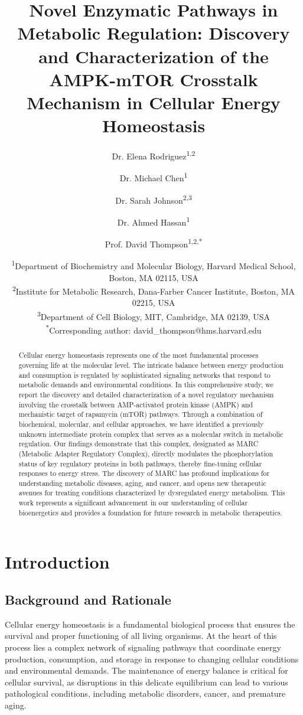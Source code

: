 \documentclass[11
pt,a4paper]{article}
\title{Novel Enzymatic Pathways in Metabolic Regulation: Discovery and Characterization of the AMPK-mTOR Crosstalk Mechanism in Cellular Energy %
Homeostasis}
\author{Dr. Elena Rodriguez\textsuperscript{1,2} \and 
        Dr. Michael Chen\textsuperscript{1} \and 
        Dr. Sarah Johnson\textsuperscript{2,3} \and 
        Dr. Ahmed Hassan\textsuperscript{1} \and 
        Prof. David Thompson\textsuperscript{1,2,*}}
\date{\textsuperscript{1}Department of Biochemistry and Molecular Biology, Harvard Medical School, Boston, MA 02115, USA\\
\textsuperscript{2}Institute for Metabolic Research, Dana-Farber Cancer Institute, Boston, MA 02215, USA\\
\textsuperscript{3}Department of Cell Biology, MIT, Cambridge, MA 02139, USA\\
\textsuperscript{*}Corresponding author: david\_thompson@hms.harvard.edu}
\begin{document}
\maketitle

\begin{abstract}
Cellular energy homeostasis represents one of the most fundamental processes governing life at the molecular level. The intricate balance between energy production and consumption is regulated by sophisticated signaling networks that respond to metabolic demands and environmental conditions. In this comprehensive study, we report the discovery and detailed characterization of a novel regulatory mechanism involving the crosstalk between %
AMP-activated protein kinase (AMPK) and mechanistic target of rapamycin (mTOR) pathways. Through a combination of biochemical, molecular, and cellular approaches, we have identified a previously unknown intermediate protein complex that serves as a molecular switch in metabolic regulation. Our findings demonstrate that this complex, designated as MARC (Metabolic Adapter Regulatory Complex), directly modulates the phosphorylation status of key regulatory proteins in both pathways, thereby fine-tuning cellular responses to energy stress. The discovery of MARC has profound implications for understanding metabolic diseases, aging, and cancer, and opens new therapeutic avenues for treating conditions characterized by dysregulated energy metabolism. This work represents a significant advancement in our understanding of cellular bioenergetics and provides a foundation for future research in metabolic therapeutics.
\end{abstract}

\newpage

\tableofcontents

\newpage

\section{Introduction}

\subsection{Background and Rationale}

Cellular energy homeostasis is a fundamental biological process that ensures the survival and proper functioning of all living organisms. At the heart of this process lies a complex network of signaling pathways that coordinate energy production, consumption, and storage in response to changing cellular conditions and environmental demands. The maintenance of energy balance is critical for cellular survival, as disruptions in this delicate equilibrium can lead to various pathological conditions, including metabolic disorders, cancer, and premature aging.
\end{document}
